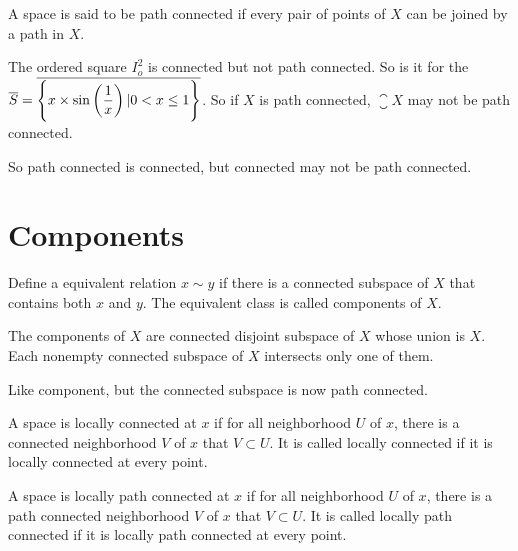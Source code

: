 \begin{definition}
    A space is said to be path connected if every pair of points of $X$ can be joined by a path in $X$.
\end{definition}

\begin{example}
    The ordered square $I_o^2$ is connected but not path connected. So is it for the  $\overline{S} = \overline{\set{\displaystyle x \times \sin \left(\frac{1}{x} \right) | 0 < x \leq 1}}$. So if $X$ is path connected, $\closure{X}$ may not be path connected.
    
    So path connected is connected, but connected may not be path connected.
\end{example}


\section{Components}

\begin{definition}
    Define a equivalent relation $x \sim y$ if there is a connected subspace of $X$ that contains both $x$ and $y$. The equivalent class is called components of $X$.
\end{definition}

\begin{theorem}
The components of $X$ are connected disjoint subspace of $X$ whose union is $X$. Each nonempty connected subspace of $X$ intersects only one of them.    
\end{theorem}

\begin{definition}
    Like component, but the connected subspace is now path connected.
\end{definition}


\begin{definition}
    A space is locally connected at $x$ if for all neighborhood $U$ of $x$, there is a connected neighborhood $V$ of $x$ that $V \subset U$. It is called locally connected if it is locally connected at every point.
\end{definition}

\begin{definition}
    A space is locally path connected at $x$ if for all neighborhood $U$ of $x$, there is a path connected neighborhood $V$ of $x$ that $V \subset U$. It is called locally path connected if it is locally path connected at every point.
\end{definition}

